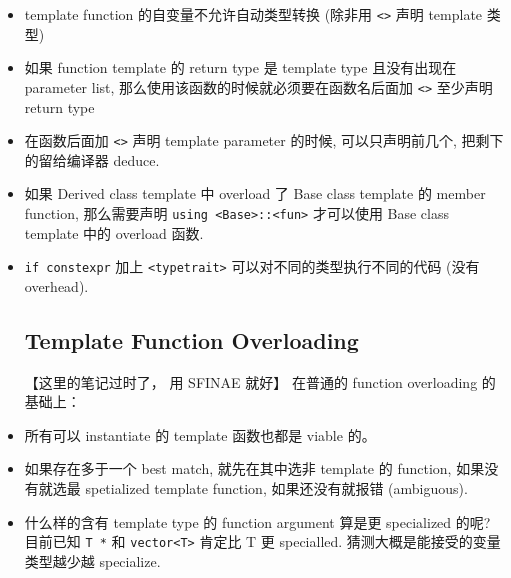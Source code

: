 
\begin{issues}
\issueDraft
\end{issues}

\begin{itemize}
\item template function 的自变量不允许自动类型转换 (除非用 \verb`<>` 声明 template 类型)
\item 如果 function template 的 return type 是 template type 且没有出现在 parameter list, 那么使用该函数的时候就必须要在函数名后面加 \verb`<>` 至少声明 return type
\item 在函数后面加 \verb`<>` 声明 template parameter 的时候, 可以只声明前几个, 把剩下的留给编译器 deduce.
\item 如果 Derived class template 中 overload 了 Base class template 的 member function, 那么需要声明 \verb`using <Base>::<fun>` 才可以使用 Base class template 中的 overload 函数.
\item \verb`if constexpr` 加上 \verb`<typetrait>` 可以对不同的类型执行不同的代码 (没有 overhead).

\subsection{Template Function Overloading}
【这里的笔记过时了， 用 SFINAE 就好】
在普通的 function overloading 的基础上：
\item 所有可以 instantiate 的 template 函数也都是 viable 的。
\item 如果存在多于一个 best match, 就先在其中选非 template 的 function, 如果没有就选最 spetialized template function, 如果还没有就报错 (ambiguous).
\item 什么样的含有 template type 的 function argument 算是更 specialized 的呢? 目前已知 \verb|T *| 和 \verb|vector<T>| 肯定比 T 更 specialled. 猜测大概是能接受的变量类型越少越 specialize.


\end{itemize}
